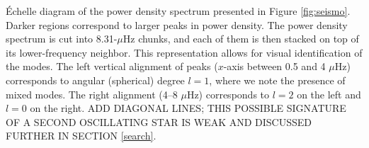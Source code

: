\label{fig:echelle} \'Echelle diagram of the power density spectrum presented in Figure \ref{fig:seismo}. Darker regions correspond to larger peaks in power density. The power density spectrum is cut into 8.31-$\mu$Hz chunks, and each of them is then stacked on top of its lower-frequency neighbor. This representation allows for visual identification of the modes. The left vertical alignment of peaks ($x$-axis between 0.5 and 4 $\mu$Hz) corresponds to angular (spherical) degree $l=1$, where we note the presence of mixed modes. The right alignment (4--8 $\mu$Hz) corresponds to $l=2$ on the left and $l=0$ on the right. ADD DIAGONAL LINES; THIS POSSIBLE SIGNATURE OF A SECOND OSCILLATING STAR IS WEAK AND DISCUSSED FURTHER IN SECTION \ref{search}.
  
  
  
  